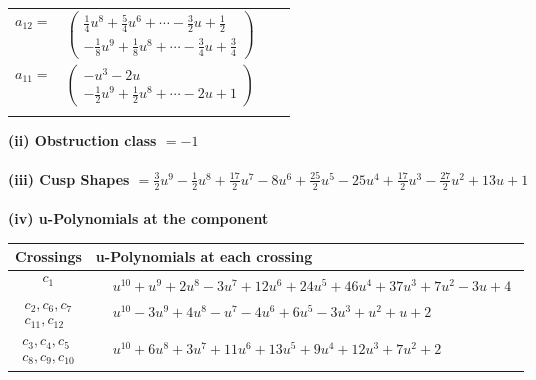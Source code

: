 \documentclass[1p]{elsarticle_modified}
\theoremstyle{definition}
\begin{document}
\begin{tabular}{m{7pt} m{180pt} m{7pt} m{180pt} }
\flushright $a_{12}=$&$\begin{pmatrix}\frac{1}{4} u^8+\frac{5}{4} u^6+\cdots-\frac{3}{2} u+\frac{1}{2}\\-\frac{1}{8} u^9+\frac{1}{8} u^8+\cdots-\frac{3}{4} u+\frac{3}{4}\end{pmatrix}$ \\
\flushright $a_{11}=$&$\begin{pmatrix}- u^3-2 u\\-\frac{1}{2} u^9+\frac{1}{2} u^8+\cdots-2 u+1\end{pmatrix}$\\&\end{tabular}
\flushleft \textbf{(ii) Obstruction class $= -1$}\\~\\
\flushleft \textbf{(iii) Cusp Shapes $= \frac{3}{2} u^9-\frac{1}{2} u^8+\frac{17}{2} u^7-8 u^6+\frac{25}{2} u^5-25 u^4+\frac{17}{2} u^3-\frac{27}{2} u^2+13 u+1$}\\~\\
\newpage\renewcommand{\arraystretch}{1}
\flushleft \textbf{(iv) u-Polynomials at the component}\newline \\
\begin{tabular}{m{50pt}|m{274pt}}
Crossings & \hspace{64pt}u-Polynomials at each crossing \\
\hline $$\begin{aligned}c_{1}\end{aligned}$$&$\begin{aligned}
&u^{10}+u^9+2 u^8-3 u^7+12 u^6+24 u^5+46 u^4+37 u^3+7 u^2-3 u+4
\end{aligned}$\\
\hline $$\begin{aligned}c_{2},c_{6},c_{7}\\c_{11},c_{12}\end{aligned}$$&$\begin{aligned}
&u^{10}-3 u^9+4 u^8- u^7-4 u^6+6 u^5-3 u^3+u^2+u+2
\end{aligned}$\\
\hline $$\begin{aligned}c_{3},c_{4},c_{5}\\c_{8},c_{9},c_{10}\end{aligned}$$&$\begin{aligned}
&u^{10}+6 u^8+3 u^7+11 u^6+13 u^5+9 u^4+12 u^3+7 u^2+2
\end{aligned}$\\
\hline
\end{tabular}\\~\\
\end{document}
